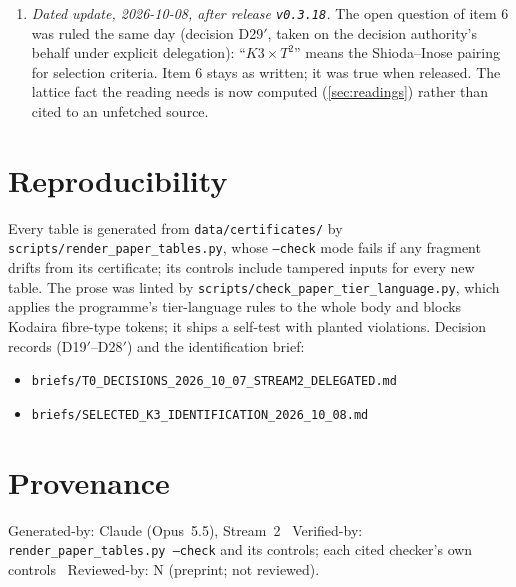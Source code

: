 \documentclass[11pt,a4paper]{article}
\theoremstyle{remark}
\begin{document}
\begin{correctionbox}
\begin{enumerate}
  its own fixed list and never read them, so no paper had been linted in CI. The table check and the paper
  lint are now in the runner itself. The first release of this note was linted locally only.
\item \emph{Dated update, 2026-10-08, after release \texttt{v0.3.18}.} The open question of item 6 was ruled
  the same day (decision D29$'$, taken on the decision authority's behalf under explicit delegation):
  ``$K3\times T^2$'' means the Shioda--Inose pairing for selection criteria. Item 6 stays as written; it was
  true when released. The lattice fact the reading needs is now computed (\cref{sec:readings}) rather than
  cited to an unfetched source.
\end{enumerate}
\end{correctionbox}

\section{Reproducibility}

Every table is generated from \texttt{data/certificates/} by \texttt{scripts/render\_paper\_tables.py},
whose \texttt{--check} mode fails if any fragment drifts from its certificate; its controls include tampered
inputs for every new table. The prose was linted by \texttt{scripts/check\_paper\_tier\_language.py}, which
applies the programme's tier-language rules to the whole body and blocks Kodaira fibre-type tokens; it ships
a self-test with planted violations. Decision records (D19$'$--D28$'$) and the identification brief:
\begin{itemize}\small
\item \nolinkurl{briefs/T0_DECISIONS_2026_10_07_STREAM2_DELEGATED.md}
\item \nolinkurl{briefs/SELECTED_K3_IDENTIFICATION_2026_10_08.md}
\end{itemize}

\section*{Provenance}
Generated-by: Claude (Opus~5.5), Stream~2 \textbar\ Verified-by: \texttt{render\_paper\_tables.py --check} and
its controls; each cited checker's own controls \textbar\ Reviewed-by: N (preprint; not reviewed).
\end{document}
